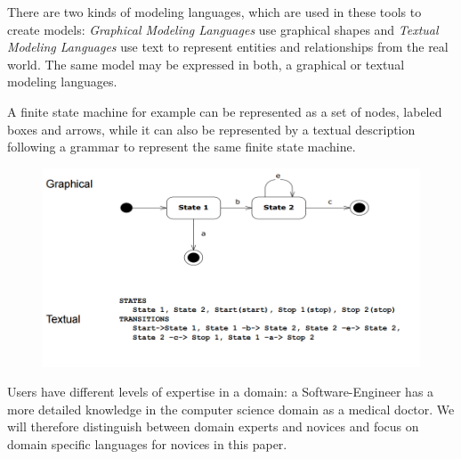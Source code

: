\documentclass[runningheads,a4paper]{llncs}
\begin{document}
 There are two kinds of modeling languages, which are used in these tools to create models:
 \emph{Graphical Modeling Languages} use graphical shapes and
 \emph{Textual Modeling Languages} use text to represent entities and relationships from the real world.
 The same model may be expressed in both, a graphical or textual modeling languages.
 
 A finite state machine for example can be represented as a set of nodes, labeled boxes and arrows, while it can also be 
 represented by a textual description following a grammar to represent the same finite state machine.
 
  \begin{figure}[H]
      \centering
      \includegraphics[width=\textwidth]{images/GraficalTextualComparison.PNG}
    \end{figure}

 Users have different levels of expertise in a domain: a Software-Engineer has a more detailed knowledge in the computer science domain as a medical doctor.
 We will therefore distinguish between domain experts and novices and focus on domain specific languages for novices in this paper.
 
%  
 
\end{document}
